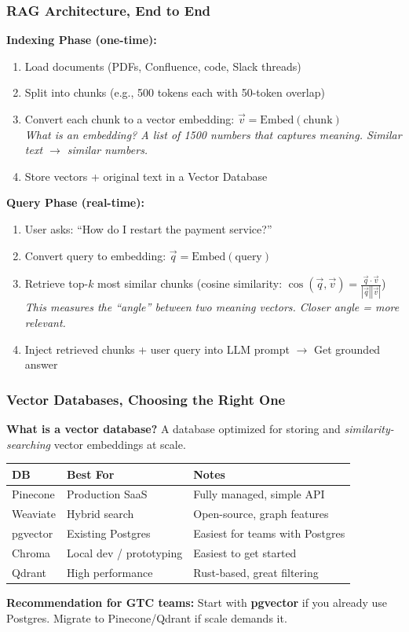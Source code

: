 \begin{frame}[fragile]\frametitle{RAG Architecture, End to End}
\textbf{Indexing Phase (one-time):}
\begin{enumerate}
\item Load documents (PDFs, Confluence, code, Slack threads)
\item Split into chunks (e.g., 500 tokens each with 50-token overlap)
\item Convert each chunk to a vector embedding: $\vec{v} = \text{Embed}(\text{chunk})$\\
  \textit{What is an embedding? A list of 1500 numbers that captures meaning. Similar text $\rightarrow$ similar numbers.}
\item Store vectors + original text in a Vector Database
\end{enumerate}

\textbf{Query Phase (real-time):}
\begin{enumerate}
\item User asks: ``How do I restart the payment service?''
\item Convert query to embedding: $\vec{q} = \text{Embed}(\text{query})$
\item Retrieve top-$k$ most similar chunks (cosine similarity: $\cos(\vec{q}, \vec{v}) = \frac{\vec{q} \cdot \vec{v}}{|\vec{q}||\vec{v}|}$)\\
  \textit{This measures the ``angle'' between two meaning vectors. Closer angle = more relevant.}
\item Inject retrieved chunks + user query into LLM prompt $\rightarrow$ Get grounded answer
\end{enumerate}
\end{frame}

\begin{frame}[fragile]\frametitle{Vector Databases, Choosing the Right One}
\textbf{What is a vector database?} A database optimized for storing and \textit{similarity-searching} vector embeddings at scale.

\begin{center}
\begin{tabular}{|p{1.2cm}|p{2cm}|p{3cm}|}
\hline
\textbf{DB} & \textbf{Best For} & \textbf{Notes} \\
\hline
Pinecone & Production SaaS & Fully managed, simple API \\
Weaviate & Hybrid search & Open-source, graph features \\
pgvector & Existing Postgres & Easiest for teams with Postgres \\
Chroma & Local dev / prototyping & Easiest to get started \\
Qdrant & High performance & Rust-based, great filtering \\
\hline
\end{tabular}
\end{center}

\textbf{Recommendation for GTC teams:} Start with \textbf{pgvector} if you already use Postgres. Migrate to Pinecone/Qdrant if scale demands it.
\end{frame}

